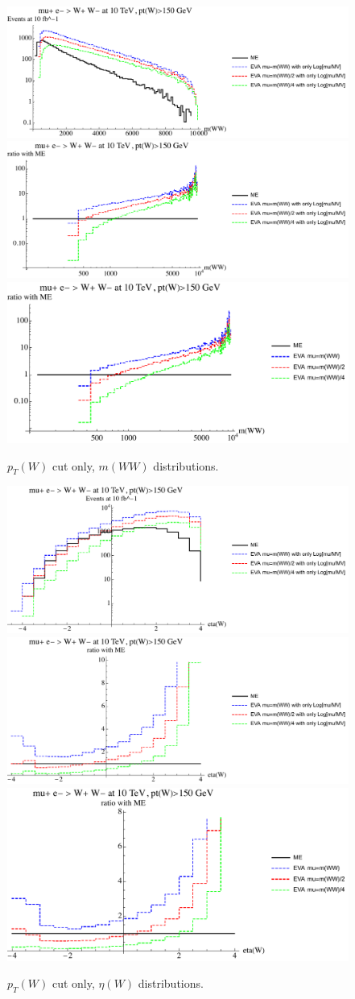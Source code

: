 \documentclass[a4paper,11pt]{article}
\begin{document}
\begin{figure}[!t]
\includegraphics[width=0.46\linewidth]{Notebooks/PlotDistr/WW_WW/10TeVolnlyptcut/plotmWW.pdf}
\includegraphics[width=0.46\linewidth]{Notebooks/PlotDistr/WW_WW/10TeVolnlyptcut/plotmWWratio1.pdf}
\includegraphics[width=0.46\linewidth]{Notebooks/PlotDistr/WW_WW/10TeVolnlyptcut/plotmWWratio2.pdf}
\caption{$p_T(W)$ cut only, $m(WW)$ distributions. \label{fig:ptcutWWWW}}

\end{figure}

\begin{figure}[!t]
\includegraphics[width=0.46\linewidth]{Notebooks/PlotDistr/WW_WW/10TeVolnlyptcut/plotetaW.pdf}
\includegraphics[width=0.46\linewidth]{Notebooks/PlotDistr/WW_WW/10TeVolnlyptcut/plotetaWratio1.pdf}
\includegraphics[width=0.46\linewidth]{Notebooks/PlotDistr/WW_WW/10TeVolnlyptcut/plotetaWratio2.pdf}
\caption{$p_T(W)$ cut only, $\eta(W)$ distributions. \label{fig:ptcutWWWW2}}
\end{figure}
\end{document}
